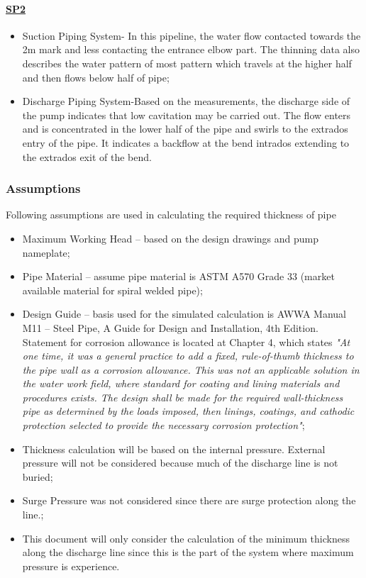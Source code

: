 \paragraph{\underline{SP2}}
\begin{itemize}
	\item Suction Piping System- In this pipeline, the water flow contacted towards the 2m mark and less contacting the entrance elbow part. The thinning data also describes the water pattern of most pattern which travels at the higher half and then flows below half of pipe;
	
	\item Discharge Piping System-Based on the measurements, the discharge side of the pump indicates that low cavitation may be carried out. The flow enters and is concentrated in the lower half of the pipe and swirls to the extrados entry of the pipe. It indicates a backflow at the bend intrados extending to the extrados exit of the bend.

\end{itemize}



\subsubsection{Assumptions}
Following assumptions are used in calculating the required thickness of pipe
\begin{itemize}
\item Maximum Working Head – based on the design drawings and pump nameplate;

\item Pipe Material – assume pipe material is ASTM A570 Grade 33 (market available material for spiral welded pipe);

\item Design Guide – basis used for the simulated calculation is AWWA  Manual M11 – Steel Pipe, A Guide for Design and Installation, 4th Edition. Statement for corrosion allowance is located at Chapter 4, which states \textit{"At one time, it was a general practice to add a fixed, rule-of-thumb thickness to the pipe wall as a corrosion allowance. This was not an applicable solution in the water work field, where standard for coating and lining materials and procedures exists. The design shall be made for the required wall-thickness pipe as determined by the loads imposed, then linings, coatings, and cathodic protection selected to provide the necessary corrosion protection"};

\item Thickness calculation will be based on the internal pressure. External pressure will not be considered because much of the discharge line is not buried;

\item 	Surge Pressure was not considered since there are surge protection along the line.;

\item 	This document will only consider the calculation of the minimum thickness along the discharge line since this is the part of the system where maximum pressure is experience.

\end{itemize}
